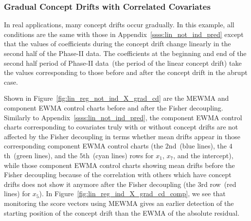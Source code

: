 \documentclass[twoside,11pt]{article}
\begin{document}
\begin{appendices}
\subsubsection{Gradual Concept Drifts with Correlated Covariates}
\label{ssss:lin_not_ind_pred_grad_cd}
In real applications, many concept drifts occur gradually. In this example, all conditions are the same with those in Appendix~\ref{ssss:lin_not_ind_pred} except that the values of coefficients during the concept drift change linearly in the second half of the Phase-II data. The coefficients at the beginning and end of the second half period of Phase-II data~(the period of the linear concept drift) take the values corresponding to those before and after the concept drift in the abrupt case. 

Shown in Figure~\ref{fig:lin_reg_not_ind_X_grad_cd} are the MEWMA and component EWMA control charts before and after the Fisher decoupling. Similarly to Appendix~\ref{ssss:lin_not_ind_pred}, the component EWMA control charts corresponding to covariates truly with or without concept drifts are not affected by the Fisher decoupling in terms whether mean drifts appear in those corresponding component EWMA control charts (the $2$nd~(blue lines), the $4$th~(green lines), and the $5$th~(cyan lines) rows for $x_1$, $x_7$, and the intercept), while those component EWMA control charts showing mean drifts before the Fisher decoupling because of the correlation with others which have concept drifts does not show it anymore after the Fisher decoupling (the $3$rd row~(red lines) for $x_5$). In Figure~\ref{fig:lin_reg_ind_X_grad_cd_comp}, we see that monitoring the score vectors using MEWMA gives an earlier detection of the starting position of the concept drift than the EWMA of the absolute residual.


\end{appendices}
\end{document}
